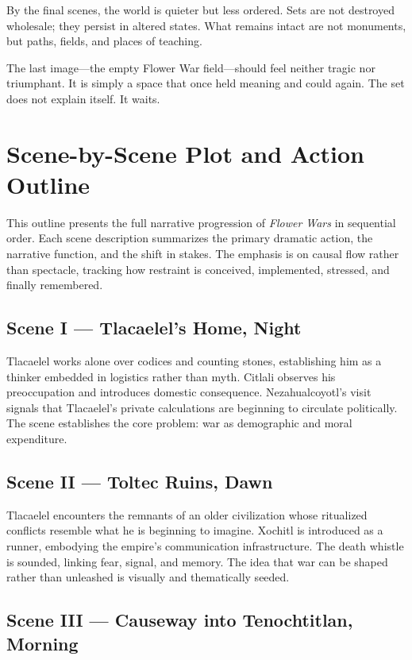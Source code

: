 \documentclass[12pt]{article}
\begin{document}
By the final scenes, the world is quieter but less ordered. Sets are not destroyed wholesale; they persist in altered states. What remains intact are not monuments, but paths, fields, and places of teaching.

The last image—the empty Flower War field—should feel neither tragic nor triumphant. It is simply a space that once held meaning and could again. The set does not explain itself. It waits.

\section*{Scene-by-Scene Plot and Action Outline}

This outline presents the full narrative progression of \textit{Flower Wars} in sequential order. Each scene description summarizes the primary dramatic action, the narrative function, and the shift in stakes. The emphasis is on causal flow rather than spectacle, tracking how restraint is conceived, implemented, stressed, and finally remembered.

\subsection*{Scene I — Tlacaelel's Home, Night}

Tlacaelel works alone over codices and counting stones, establishing him as a thinker embedded in logistics rather than myth. Citlali observes his preoccupation and introduces domestic consequence. Nezahualcoyotl's visit signals that Tlacaelel's private calculations are beginning to circulate politically. The scene establishes the core problem: war as demographic and moral expenditure.

\subsection*{Scene II — Toltec Ruins, Dawn}

Tlacaelel encounters the remnants of an older civilization whose ritualized conflicts resemble what he is beginning to imagine. Xochitl is introduced as a runner, embodying the empire's communication infrastructure. The death whistle is sounded, linking fear, signal, and memory. The idea that war can be shaped rather than unleashed is visually and thematically seeded.

\subsection*{Scene III — Causeway into Tenochtitlan, Morning}
\end{document}
